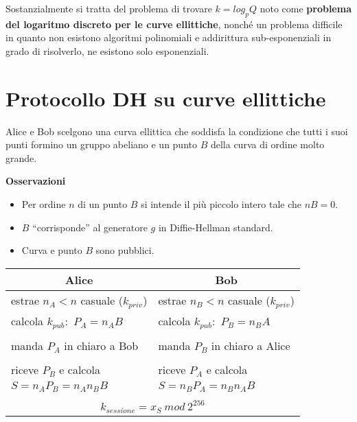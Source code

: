 Sostanzialmente si tratta del problema di trovare $k = log_p Q$ noto come \textbf{problema del logaritmo discreto per le curve ellittiche}, nonché un problema difficile in quanto non esistono algoritmi polinomiali e addirittura sub-esponenziali in grado di risolverlo, ne esistono solo esponenziali.\

\section{Protocollo DH su curve ellittiche}

Alice e Bob scelgono una curva ellittica che soddisfa la condizione che tutti i suoi punti formino un gruppo abeliano e un punto $B$ della curva di ordine molto grande.\

\vspace{12pt}
\noindent\textbf{Osservazioni}
\begin{itemize}
    \item Per ordine $n$ di un punto $B$ si intende il più piccolo intero tale che $nB = 0$.\
    \item $B$ ``corrisponde'' al generatore $g$ in Diffie-Hellman standard.\
    \item Curva e punto $B$ sono pubblici.\
\end{itemize}

\begin{table}[H]
    \centering
    \begin{tabular}{l|l}
        \multicolumn{1}{c}{Alice}                      & \multicolumn{1}{c}{Bob}                        \\\hline
        estrae $n_A < n$ casuale ($k_{\mathit{priv}}$) & estrae $n_B < n$ casuale ($k_{\mathit{priv}}$) \\
        calcola $k_{\mathit{pub}}$:\ $P_A = n_AB$      & calcola $k_{\mathit{pub}}$:\ $P_B = n_BA$      \\
                                                       &                                                \\
        manda $P_A$ in chiaro a Bob                    & manda $P_B$ in chiaro a Alice                  \\
                                                       &                                                \\
        riceve $P_B$ e calcola                         & riceve $P_A$ e calcola                         \\
        $S = n_A P_B = n_A n_B B$                      & $S = n_B P_A = n_B n_A B$                      \\
                                                       &                                                \\
        \multicolumn{2}{c}{$k_{\mathit{sessione}} = x_S\ \mathit{mod}\ 2^{256}$}                        \\
    \end{tabular}
\end{table}

